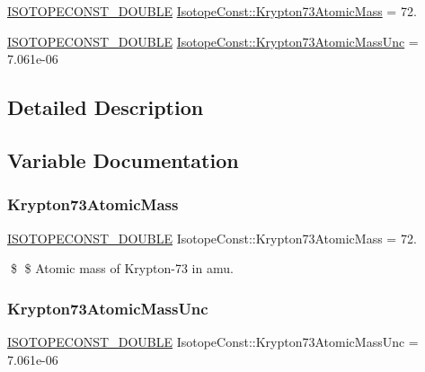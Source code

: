 \begin{DoxyCompactItemize}
\item 
\mbox{\hyperlink{group___isotope_const-_macros_ga8f45a7272ce02c0b4c65c44636ed719a}{I\+S\+O\+T\+O\+P\+E\+C\+O\+N\+S\+T\+\_\+\+D\+O\+U\+B\+LE}} \mbox{\hyperlink{group___isotope_const-_krypton-_kr73_ga453c097baaa0031619dafc5f3e9e4cb3}{Isotope\+Const\+::\+Krypton73\+Atomic\+Mass}} = 72.
\item 
\mbox{\hyperlink{group___isotope_const-_macros_ga8f45a7272ce02c0b4c65c44636ed719a}{I\+S\+O\+T\+O\+P\+E\+C\+O\+N\+S\+T\+\_\+\+D\+O\+U\+B\+LE}} \mbox{\hyperlink{group___isotope_const-_krypton-_kr73_ga36ba393371ef0e8d8935d1e3363e777b}{Isotope\+Const\+::\+Krypton73\+Atomic\+Mass\+Unc}} = 7.\+061e-\/06
\end{DoxyCompactItemize}


\subsection{Detailed Description}


\subsection{Variable Documentation}
\mbox{\label{group___isotope_const-_krypton-_kr73_ga453c097baaa0031619dafc5f3e9e4cb3}} 
\subsubsection{\texorpdfstring{Krypton73\+Atomic\+Mass}{Krypton73AtomicMass}}
{\footnotesize\ttfamily \mbox{\hyperlink{group___isotope_const-_macros_ga8f45a7272ce02c0b4c65c44636ed719a}{I\+S\+O\+T\+O\+P\+E\+C\+O\+N\+S\+T\+\_\+\+D\+O\+U\+B\+LE}} Isotope\+Const\+::\+Krypton73\+Atomic\+Mass = 72.}

\$ \$ Atomic mass of Krypton-\/73 in amu. \mbox{\label{group___isotope_const-_krypton-_kr73_ga36ba393371ef0e8d8935d1e3363e777b}} 
\subsubsection{\texorpdfstring{Krypton73\+Atomic\+Mass\+Unc}{Krypton73AtomicMassUnc}}
{\footnotesize\ttfamily \mbox{\hyperlink{group___isotope_const-_macros_ga8f45a7272ce02c0b4c65c44636ed719a}{I\+S\+O\+T\+O\+P\+E\+C\+O\+N\+S\+T\+\_\+\+D\+O\+U\+B\+LE}} Isotope\+Const\+::\+Krypton73\+Atomic\+Mass\+Unc = 7.\+061e-\/06}

